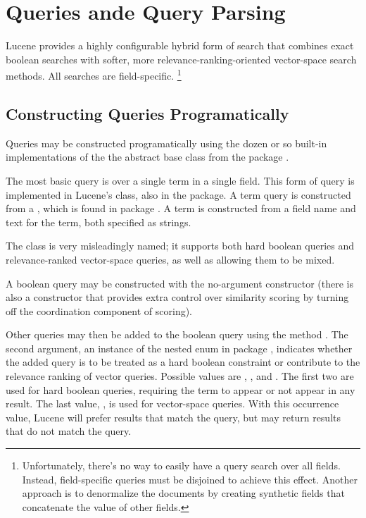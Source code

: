 \section{Queries ande Query Parsing}

Lucene provides a highly configurable hybrid form of search that
combines exact boolean searches with softer, more
relevance-ranking-oriented vector-space search methods.  All searches
are field-specific.
%
\footnote{Unfortunately, there's no way to easily have a query search
  over all fields.  Instead, field-specific queries must be disjoined
  to achieve this effect.  Another approach is to denormalize the
  documents by creating synthetic fields that concatenate the value of
  other fields.}

\subsection{Constructing Queries Programatically}

Queries may be constructed programatically using the dozen or so
built-in implementations of the the  abstract base class
from the package .  

The most basic query is over a single term in a single field.  This
form of query is implemented in Lucene's  class, also
in the  package.  A term query is constructed from a
, which is found in package .
A term is constructed from a field name and text for the term, both
specified as strings.

The  class is very misleadingly named; it
supports both hard boolean queries and relevance-ranked vector-space
queries, as well as allowing them to be mixed.

A boolean query may be constructed with the no-argument constructor
 (there is also a constructor that provides extra
control over similarity scoring by turning off the coordination component
of scoring).

Other queries may then be added to the boolean query using the method
.  The second argument, an
instance of the nested enum  in package
, indicates whether the added query is to be treated as a
hard boolean constraint or contribute to the relevance ranking of
vector queries.  Possible values are ,
, and .  The
first two are used for hard boolean queries, requiring the term to
appear or not appear in any result.  The last value, , is
used for vector-space queries.  With this occurrence value, Lucene
will prefer results that match the query, but may return results that
do not match the query.%

